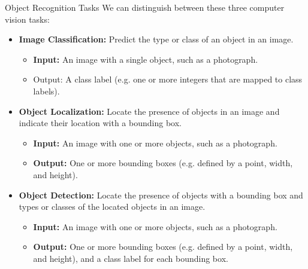 \documentclass[12pt]{beamer}
\begin{document}
\begin{frame}{Object Recognition Tasks}
\small
We can distinguish between these three computer vision tasks:
\begin{itemize}

\item \textbf{Image Classification:} Predict the type or class of an object in an image.
\begin{itemize}
\tiny
\item \textbf{Input:} An image with a single object, such as a photograph.
\item Output: A class label (e.g. one or more integers that are mapped to class labels).
\end{itemize}
\item \textbf{Object Localization:} Locate the presence of objects in an image and indicate their location with a bounding box.
\begin{itemize}
\tiny
\item \textbf{Input:} An image with one or more objects, such as a photograph.
\item \textbf{Output:} One or more bounding boxes (e.g. defined by a point, width, and height).
\end{itemize}
\item \textbf{Object Detection:} Locate the presence of objects with a bounding box and types or classes of the located objects in an image.
\begin{itemize}
\tiny
\item \textbf{Input:} An image with one or more objects, such as a photograph.
\item \textbf{Output:} One or more bounding boxes (e.g. defined by a point, width, and height), and a class label for each bounding box.
\end{itemize}
\end{itemize}
\end{frame}
\end{document}
